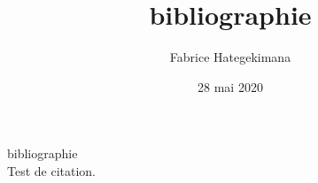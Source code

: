 \documentclass{article}
\begin{document}
		\title{bibliographie}
		\date{28 mai 2020}
		\author{Fabrice Hategekimana}
		\maketitle
 	bibliographie \\
	\cite{janssen_introduction_2016}
	Test de citation. \\
	 \printbibliography
\end{document}
